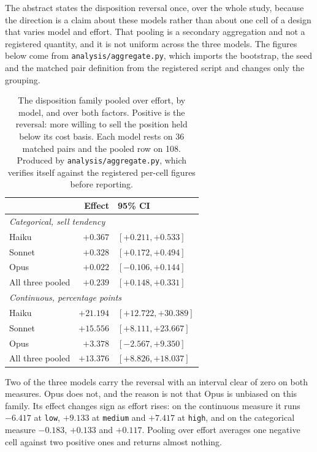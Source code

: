 \label{sec:disposition}\label{app:disposition}
The abstract states the disposition reversal once, over the whole study,
because the direction is a claim about these models rather than about one
cell of a design that varies model and effort. That pooling is a secondary
aggregation and not a registered quantity, and it is not uniform across the
three models. The figures below come from \texttt{analysis/aggregate.py},
which imports the bootstrap, the seed and the matched pair definition from
the registered script and changes only the grouping.

\begin{table}[t]
  \centering
  \footnotesize
  \begin{tabular}{lrl}
    \toprule
                     & Effect & 95\% CI \\
    \midrule
    \multicolumn{3}{l}{\textit{Categorical, sell tendency}} \\
    Haiku            & $+0.367$  & $[+0.211, +0.533]$ \\
    Sonnet           & $+0.328$  & $[+0.172, +0.494]$ \\
    Opus             & $+0.022$  & $[-0.106, +0.144]$ \\
    All three pooled & $+0.239$  & $[+0.148, +0.331]$ \\
    \midrule
    \multicolumn{3}{l}{\textit{Continuous, percentage points}} \\
    Haiku            & $+21.194$ & $[+12.722, +30.389]$ \\
    Sonnet           & $+15.556$ & $[+8.111, +23.667]$ \\
    Opus             & $+3.378$  & $[-2.567, +9.350]$ \\
    All three pooled & $+13.376$ & $[+8.826, +18.037]$ \\
    \bottomrule
  \end{tabular}
  \caption{The disposition family pooled over effort, by model, and over
  both factors. Positive is the reversal: more willing to sell the position
  held below its cost basis. Each model rests on 36 matched pairs and the
  pooled row on 108. Produced by \texttt{analysis/aggregate.py}, which
  verifies itself against the registered per-cell figures before reporting.}
  \label{tab:disposition}
\end{table}

Two of the three models carry the reversal with an interval clear of zero on
both measures. Opus does not, and the reason is not that Opus is unbiased on
this family. Its effect changes sign as effort rises: on the continuous
measure it runs $-6.417$ at \texttt{low}, $+9.133$ at \texttt{medium} and
$+7.417$ at \texttt{high}, and on the categorical measure $-0.183$, $+0.133$
and $+0.117$. Pooling over effort averages one negative cell against two
positive ones and returns almost nothing.

